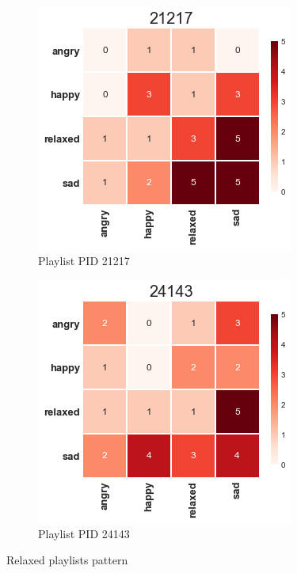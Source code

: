 \begin{figure}[H]
  \centering
  \begin{subfigure}[b]{0.49\linewidth}
    \includegraphics[width=\linewidth]{./chapters/chapter5/images/21217.png}
    \caption{Playlist PID 21217}
  \end{subfigure}
  \begin{subfigure}[b]{0.49\linewidth}
   \includegraphics[width=\linewidth]{./chapters/chapter5/images/24143.png}
    \caption{Playlist PID 24143}
  \end{subfigure}
  \caption{Relaxed playlists pattern}
  \label{fig:ann}
\end{figure}

